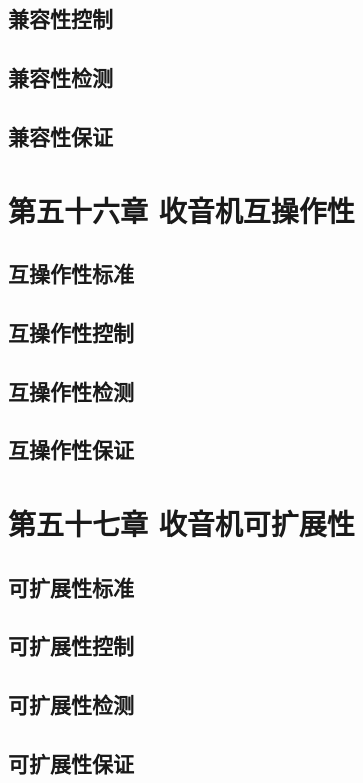 \documentclass[12pt,UTF8]{ctexbook}
\begin{document}
\section{兼容性控制}
\section{兼容性检测}
\section{兼容性保证}

\chapter{第五十六章 收音机互操作性}

\section{互操作性标准}
\section{互操作性控制}
\section{互操作性检测}
\section{互操作性保证}

\chapter{第五十七章 收音机可扩展性}

\section{可扩展性标准}
\section{可扩展性控制}
\section{可扩展性检测}
\section{可扩展性保证}
\end{document}
